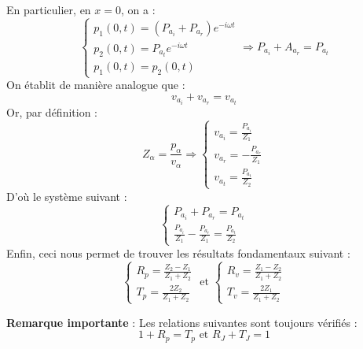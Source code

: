 En particulier, en $x=0$, on a :
\[
\left \{
\begin{array}{l}
p_1(0,t)=(P_{a_i}+P_{a_r})e^{-i\omega t} \\
p_2(0,t)=P_{a_t}e^{-i\omega t} \\
p_1(0,t)=p_2(0,t)
\end{array}
\right.
\Rightarrow P_{a_i}+A_{a_r}=P_{a_t}
\]
On établit de manière analogue que :
\[ v_{a_i}+v_{a_r}=v_{a_t} \]
Or, par définition :
\[
Z_\alpha=\frac{p_\alpha}{v_\alpha} \Rightarrow 
\left\{
\begin{array}{l}
v_{a_i}=\frac{P_{a_i}}{Z_1} \\
v_{a_r}=-\frac{P_{a_r}}{Z_1} \\
v_{a_t}=\frac{P_{a_t}}{Z_2}
\end{array}
\right.
\]
D'où le système suivant :
\[
\left\{
\begin{array}{l}
P_{a_i}+P_{a_r}=P_{a_t} \\
\frac{P_{a_i}}{Z_1}-\frac{P_{a_r}}{Z_1}=\frac{P_{a_t}}{Z_2}
\end{array}
\right.
\]
Enfin, ceci nous permet de trouver les résultats fondamentaux suivant :
\[
\left\{
\begin{array}{ll}
R_p=\frac{Z_2-Z_1}{Z_1+Z_2} \\
T_p=\frac{2Z_2}{Z_1+Z_2}
\end{array}
\right.
\textrm{ et }
\left\{
\begin{array}{ll}
R_v=\frac{Z_1-Z_2}{Z_1+Z_2} \\
T_v=\frac{2Z_1}{Z_1+Z_2}
\end{array}
\right.
\]

\noindent\textbf{Remarque importante} : Les relations suivantes sont toujours vérifiés :
\[ 1+R_p=T_p \textrm{ et } R_J+T_J=1 \]

